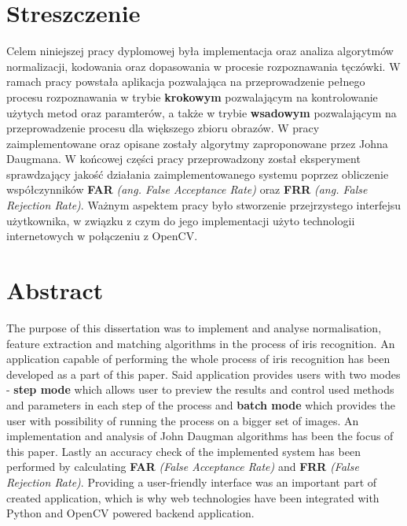 \section*{Streszczenie}

Celem niniejszej pracy dyplomowej była implementacja oraz analiza algorytmów normalizacji,
kodowania oraz dopasowania w procesie rozpoznawania tęczówki. W ramach pracy powstała aplikacja
pozwalająca na przeprowadzenie pełnego procesu rozpoznawania w trybie \textbf{krokowym} pozwalającym
na kontrolowanie użytych metod oraz paramterów, a także w trybie \textbf{wsadowym} pozwalającym na przeprowadzenie
procesu dla większego zbioru obrazów. W pracy zaimplementowane oraz opisane zostały algorytmy zaproponowane przez
Johna Daugmana. W końcowej części pracy przeprowadzony został eksperyment sprawdzający jakoś\'c
działania zaimplementowanego systemu poprzez obliczenie współczynników \textbf{FAR} \textit{(ang. False Acceptance Rate)}
oraz \textbf{FRR} \textit{(ang. False Rejection Rate)}. Ważnym aspektem pracy było stworzenie
przejrzystego interfejsu użytkownika, w związku z czym do jego implementacji użyto technologii
internetowych w połączeniu z OpenCV.

\section*{Abstract}

The purpose of this dissertation was to implement and analyse normalisation, feature extraction
and matching algorithms in the process of iris recognition. An application capable of performing
the whole process of iris recognition has been developed as a part of this paper. Said application
provides users with two modes - \textbf{step mode} which allows user to preview the results and control used
methods and parameters in each step of the process and \textbf{batch mode} which provides the user
with possibility of running the process on a bigger set of images. An implementation and analysis
of John Daugman algorithms has been the focus of this paper. Lastly an accuracy check of the implemented
system has been performed by calculating \textbf{FAR} \textit{(False Acceptance Rate)} and \textbf{FRR} \textit{(False Rejection Rate)}.
Providing a user-friendly interface was an important part of created application, which is why
web technologies have been integrated with Python and OpenCV powered backend application.
